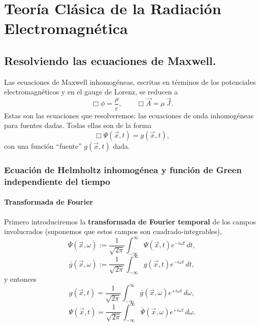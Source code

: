 \chapter{Teoría Clásica de la Radiación Electromagnética}\label{caprad}

\section{Resolviendo las ecuaciones de Maxwell.}\label{resolvmax}

Las ecuaciones de Maxwell inhomogéneas, escritas en términos de los potenciales electromagnéticos y en el gauge de Lorenz, se reducen a
\begin{equation}
 \Box\phi=\frac{\rho}{\varepsilon}, \qquad  \Box\vec{A}=\mu\,\vec{J}.
\end{equation}
Estas son las ecuaciones que resolveremos: las ecuaciones de onda
inhomogéneas para fuentes dadas. Todas ellas son de la forma
\begin{equation}
\Box \Psi(\vec{x},t)=g(\vec{x},t), \label{oih}
\end{equation}
con una función ``fuente'' $g(\vec{x},t)$ dada.


\subsection{Ecuación de Helmholtz inhomogénea y función de Green independiente del tiempo}
\subsubsection{Transformada de Fourier}
Primero introduciremos la \textbf{transformada de Fourier temporal} de los campos involucrados (suponemos que estos campos son cuadrado-integrables),
\begin{equation}
\bar{\Psi}(\vec{x},\omega):=\frac{1}{\sqrt{2\pi}}\int_{-\infty}^\infty
\Psi(\vec{x},t)e^{-i\omega t}\,dt,
\end{equation}
\begin{equation}
\bar{g}(\vec{x},\omega):=\frac{1}{\sqrt{2\pi}}\int_{-\infty}^\infty
g(\vec{x},t)e^{-i\omega t}\,dt ,
\end{equation}
y entonces
\begin{equation}
g(\vec{x},t)=\frac{1}{\sqrt{2\pi}}\int_{-\infty}^\infty
\bar{g}(\vec{x},\omega)e^{+i\omega t}\,d\omega,
\end{equation}
\begin{equation}
\Psi(\vec{x},t)=\frac{1}{\sqrt{2\pi}}\int_{-\infty}^\infty
\bar{\Psi}(\vec{x},\omega)e^{+i\omega t}\,d\omega.
\end{equation}

